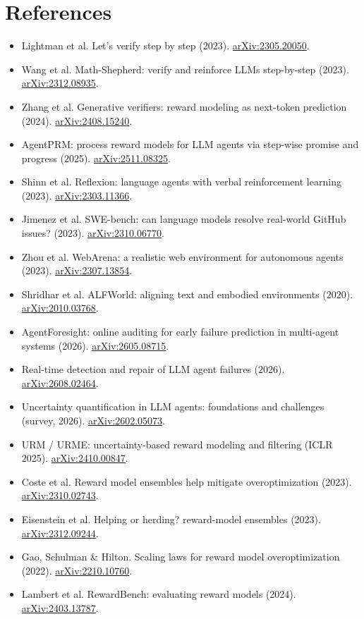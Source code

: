 \documentclass[11pt]{article}
\newcommand{\arxiv}[1]{\href{https://arxiv.org/abs/#1}{arXiv:#1}}
\begin{document}
\section*{References}
\small
\begin{itemize}[leftmargin=1.2em,itemsep=1pt]
  \item Lightman et al. Let's verify step by step (2023). \arxiv{2305.20050}.
  \item Wang et al. Math-Shepherd: verify and reinforce LLMs step-by-step (2023). \arxiv{2312.08935}.
  \item Zhang et al. Generative verifiers: reward modeling as next-token prediction (2024). \arxiv{2408.15240}.
  \item AgentPRM: process reward models for LLM agents via step-wise promise and progress (2025). \arxiv{2511.08325}.
  \item Shinn et al. Reflexion: language agents with verbal reinforcement learning (2023). \arxiv{2303.11366}.
  \item Jimenez et al. SWE-bench: can language models resolve real-world GitHub issues? (2023). \arxiv{2310.06770}.
  \item Zhou et al. WebArena: a realistic web environment for autonomous agents (2023). \arxiv{2307.13854}.
  \item Shridhar et al. ALFWorld: aligning text and embodied environments (2020). \arxiv{2010.03768}.
  \item AgentForesight: online auditing for early failure prediction in multi-agent systems (2026). \arxiv{2605.08715}.
  \item Real-time detection and repair of LLM agent failures (2026). \arxiv{2608.02464}.
  \item Uncertainty quantification in LLM agents: foundations and challenges (survey, 2026). \arxiv{2602.05073}.
  \item URM / URME: uncertainty-based reward modeling and filtering (ICLR 2025). \arxiv{2410.00847}.
  \item Coste et al. Reward model ensembles help mitigate overoptimization (2023). \arxiv{2310.02743}.
  \item Eisenstein et al. Helping or herding? reward-model ensembles (2023). \arxiv{2312.09244}.
  \item Gao, Schulman \& Hilton. Scaling laws for reward model overoptimization (2022). \arxiv{2210.10760}.
  \item Lambert et al. RewardBench: evaluating reward models (2024). \arxiv{2403.13787}.
\end{itemize}
\end{document}
